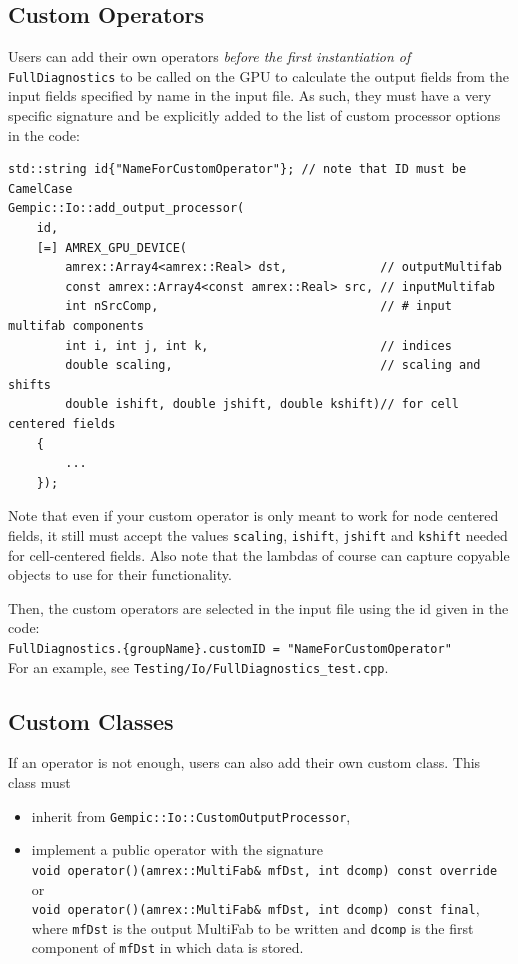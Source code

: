 \documentclass[11pt]{article}
\begin{document}
\subsection{Custom Operators}\label{sec:cusOp}
Users can add their own operators \emph{before the first instantiation of} \lstinline|FullDiagnostics| to be called on the GPU to calculate the output fields from the input fields specified by name in the input file. As such, they must have a very specific signature and be explicitly added to the list of custom processor options in the code:
\begin{lstlisting}
std::string id{"NameForCustomOperator"}; // note that ID must be CamelCase
Gempic::Io::add_output_processor(
    id,
    [=] AMREX_GPU_DEVICE(
        amrex::Array4<amrex::Real> dst,             // outputMultifab
        const amrex::Array4<const amrex::Real> src, // inputMultifab
        int nSrcComp,                               // # input multifab components
        int i, int j, int k,                        // indices
        double scaling,                             // scaling and shifts
        double ishift, double jshift, double kshift)// for cell centered fields
    {
        ...
    });
\end{lstlisting}
Note that even if your custom operator is only meant to work for node centered fields, it still must accept the values \verb|scaling|, \verb|ishift|, \verb|jshift| and \verb|kshift| needed for cell-centered fields.
Also note that the lambdas of course can capture copyable objects to use for their functionality.

Then, the custom operators are selected in the input file using the id given in the code:
\\\lstinline|FullDiagnostics.{groupName}.customID = "NameForCustomOperator"|\\
%
For an example, see \verb|Testing/Io/FullDiagnostics_test.cpp|.

\subsection{Custom Classes}\label{sec:cusClass}
If an operator is not enough, users can also add their own custom class. This class must
\begin{itemize}
    \item inherit from \verb|Gempic::Io::CustomOutputProcessor|,
    \item implement a public operator with the signature\\
    \lstinline|void operator()(amrex::MultiFab& mfDst, int dcomp) const override|\\or\\
    \lstinline|void operator()(amrex::MultiFab& mfDst, int dcomp) const final|,
    where \lstinline|mfDst| is the output MultiFab to be written and \lstinline|dcomp| is the first component of \lstinline|mfDst| in which data is stored.
\end{itemize}
\end{document}
